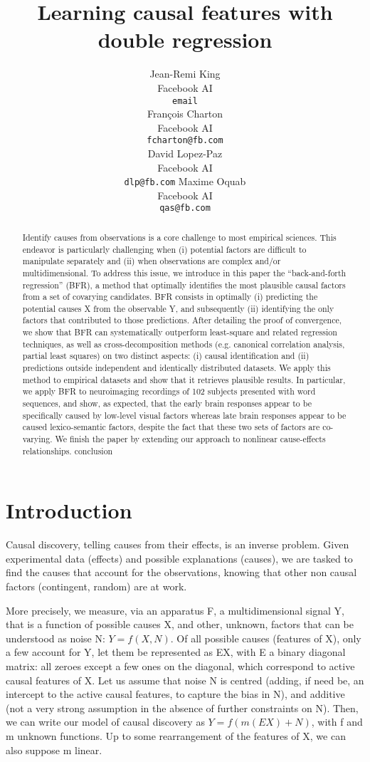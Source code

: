 \documentclass{article}
\title{Learning causal features with double regression}
\author{%
  Jean-Remi King\\
  Facebook AI\\
  \texttt{email} \\
  \And
  Fran\c{c}ois Charton\\
  Facebook AI\\
  \texttt{fcharton@fb.com}\\
  \And
  David Lopez-Paz\\
  Facebook AI\\
  \texttt{dlp@fb.com}
  \And
  Maxime Oquab\\
  Facebook AI\\
  \texttt{qas@fb.com}
}
\begin{document}
\maketitle

\begin{abstract}
Identify causes from observations is a core challenge to most empirical sciences. This endeavor is particularly challenging when (i) potential factors are difficult to manipulate separately and (ii) when observations are complex and/or multidimensional. To address this issue, we introduce in this paper the “back-and-forth regression” (BFR), a method that optimally identifies the most plausible causal factors from a set of covarying candidates. BFR consists in optimally (i) predicting the potential causes X from the observable Y, and subsequently (ii) identifying the only factors that contributed to those predictions. After detailing the proof of convergence, we show that BFR can systematically outperform least-square and related regression techniques, as well as cross-decomposition methods (e.g. canonical correlation analysis, partial least squares) on two distinct aspects: (i) causal identification and (ii) predictions outside independent and identically distributed datasets. We apply this method to empirical datasets and show that it retrieves plausible results. In particular, we apply BFR to neuroimaging recordings of 102 subjects presented with word sequences, and show, as expected, that the early brain responses appear to be specifically caused by low-level visual factors whereas late brain responses appear to be caused lexico-semantic factors, despite the fact that these two sets of factors are co-varying. We finish the paper by extending our approach to nonlinear cause-effects relationships. conclusion
\end{abstract}

\section{Introduction}


Causal discovery, telling causes from their effects, is an inverse problem.
%
Given experimental data (effects) and possible explanations (causes), we are tasked to find the causes that account for the observations, knowing that other non causal factors (contingent, random) are at work.

More precisely, we measure, via an apparatus F, a multidimensional signal Y, that is a function of possible causes X, and other, unknown, factors that can be understood as noise N: $Y=f(X,N)$.
%
Of all possible causes (features of X), only a few account for Y, let them be represented as EX, with E a binary diagonal matrix: all zeroes except a few ones on the diagonal, which correspond to active causal features of X.
%
Let us assume that noise N is centred (adding, if need be, an intercept to the active causal features, to capture the bias in N), and additive (not a very strong assumption in the absence of further constraints on N).
%
Then, we can write our model of causal discovery as $Y=f(m(EX)+N)$, with f and m unknown functions.
%
Up to some rearrangement of the features of X, we can also suppose m linear.
\end{document}

